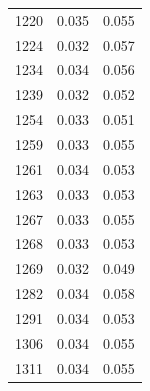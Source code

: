 \begin{tabular}{rrr}
1220 & 0.035 & 0.055 \\
1224 & 0.032 & 0.057 \\
1234 & 0.034 & 0.056 \\
1239 & 0.032 & 0.052 \\
1254 & 0.033 & 0.051 \\
1259 & 0.033 & 0.055 \\
1261 & 0.034 & 0.053 \\
1263 & 0.033 & 0.053 \\
1267 & 0.033 & 0.055 \\
1268 & 0.033 & 0.053 \\
1269 & 0.032 & 0.049 \\
1282 & 0.034 & 0.058 \\
1291 & 0.034 & 0.053 \\
1306 & 0.034 & 0.055 \\
1311 & 0.034 & 0.055 \\
\bottomrule
\end{tabular}
